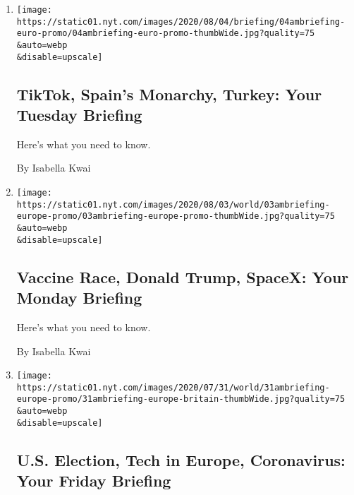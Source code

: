 \begin{enumerate}
\def\labelenumi{\arabic{enumi}.}
\item
  \href{/2020/08/03/briefing/tiktok-spain-turkey.html}{}

  \texttt{[image: https://static01.nyt.com/images/2020/08/04/briefing/04ambriefing-euro-promo/04ambriefing-euro-promo-thumbWide.jpg?quality=75\\\&auto=webp\\\&disable=upscale]}

  \hypertarget{tiktok-spains-monarchy-turkey-your-tuesday-briefing}{%
  \subsection{TikTok, Spain's Monarchy, Turkey: Your Tuesday
  Briefing}\label{tiktok-spains-monarchy-turkey-your-tuesday-briefing}}

  Here's what you need to know.

  By Isabella Kwai
\item
  \href{/2020/08/02/briefing/vaccine-race-donald-trump-spacex.html}{}

  \texttt{[image: https://static01.nyt.com/images/2020/08/03/world/03ambriefing-europe-promo/03ambriefing-europe-promo-thumbWide.jpg?quality=75\\\&auto=webp\\\&disable=upscale]}

  \hypertarget{vaccine-race-donald-trump-spacex-your-monday-briefing}{%
  \subsection{Vaccine Race, Donald Trump, SpaceX: Your Monday
  Briefing}\label{vaccine-race-donald-trump-spacex-your-monday-briefing}}

  Here's what you need to know.

  By Isabella Kwai
\item
  \href{/2020/07/31/briefing/american-election-tech-europe-coronavirus.html}{}

  \texttt{[image: https://static01.nyt.com/images/2020/07/31/world/31ambriefing-europe-promo/31ambriefing-europe-britain-thumbWide.jpg?quality=75\\\&auto=webp\\\&disable=upscale]}

  \hypertarget{us-election-tech-in-europe-coronavirus-your-friday-briefing}{%
  \subsection{U.S. Election, Tech in Europe, Coronavirus: Your Friday
  Briefing}\label{us-election-tech-in-europe-coronavirus-your-friday-briefing}}


\end{enumerate}
